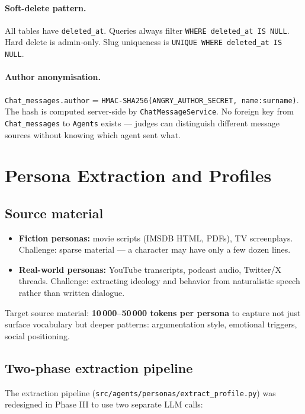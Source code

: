 \documentclass[12pt,a4paper]{article}
\begin{document}
\paragraph{Soft-delete pattern.}
All tables have \texttt{deleted\_at}. Queries always filter \texttt{WHERE deleted\_at IS NULL}.
Hard delete is admin-only. Slug uniqueness is \texttt{UNIQUE WHERE deleted\_at IS NULL}.

\paragraph{Author anonymisation.}
\texttt{Chat\_messages.author} = \texttt{HMAC-SHA256(ANGRY\_AUTHOR\_SECRET, name:surname)}.
The hash is computed server-side by \texttt{ChatMessageService}. No foreign key from
\texttt{Chat\_messages} to \texttt{Agents} exists --- judges can distinguish different
message sources without knowing which agent sent what.

\section{Persona Extraction and Profiles}

\subsection{Source material}

\begin{itemize}
  \item \textbf{Fiction personas:} movie scripts (IMSDB HTML, PDFs), TV screenplays.
        Challenge: sparse material --- a character may have only a few dozen lines.
  \item \textbf{Real-world personas:} YouTube transcripts, podcast audio, Twitter/X threads.
        Challenge: extracting ideology and behavior from naturalistic speech rather than
        written dialogue.
\end{itemize}

Target source material: \textbf{10\,000--50\,000 tokens per persona} to capture not just
surface vocabulary but deeper patterns: argumentation style, emotional triggers, social
positioning.

\subsection{Two-phase extraction pipeline}

The extraction pipeline (\texttt{src/agents/personas/extract\_profile.py}) was redesigned
in Phase III to use two separate LLM calls:
\end{document}
